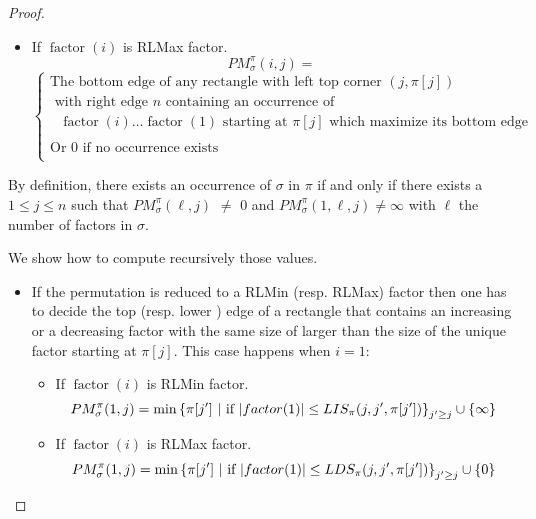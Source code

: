 \documentclass[a4paper]{llncs}
\newcommand{\ptext}{\pi}
\newcommand{\ppattern}{\sigma}
\newcounter{num}
\newcommand{\PM}{PM}
\DeclareMathOperator{\factor}{factor}
\begin{document}
\begin{proof}
\begin{itemize}
\item If $\factor(i)$ is RLMax factor.
$$
\PM^\pi_\sigma(i,j) =
$$
$$
\begin{cases}

	\text{The bottom edge of any rectangle with left top corner   $(j,\pi[j])$} \\
	\text{ with right edge  $n$ containing an occurrence of  } \\
	\text{ $\factor(i) \ldots \factor(1)$ starting at $\pi[j]$ which
	maximize its bottom edge}  \\
	\text{ } \\
	\text{Or $0$ if no occurrence exists} \text{} \\
\end{cases}
$$

\end{itemize}

By definition, there exists an occurrence of $\ppattern$ in $\ptext$ if and only if
there exists a $1 \leq j \leq n$ such that
$\PM^\pi_\sigma(\ell,j)$ $\neq$ $0$ and $\PM^\pi_\sigma(1,\ell,j) \neq \infty$
with $\ell$ the number of factors in $\ppattern$.

We show how to compute recursively those values.
\begin{itemize}
\item If the permutation is reduced to a RLMin (resp. RLMax) factor
then one has to decide the top (resp. lower ) edge of
a rectangle that
contains an increasing or a decreasing factor
with the same size of larger than the
size of the unique factor starting at $\pi[j]$.
This case happens when $i=1$:

\begin{itemize}
\item If $\factor(i)$ is RLMin factor.
$$
\PM^\pi_\sigma(1,j) = \min \text{\{$\pi[j']$ $ |$ if $ |factor(1)| \leq LIS_{\ptext}(j,j',\pi[j'])$\}}_{j'\geq j} \cup \{\infty\}
$$




\item If $\factor(i)$ is RLMax factor.
$$
\PM^\pi_\sigma(1,j) = \min \text{\{$\pi[j']$ $ |$ if $ |factor(1)| \leq LDS_{\ptext}(j,j',\pi[j'])$\}}_{j'\geq j} \cup \{0\}
$$
\end{itemize}




\end{itemize}
\end{proof}
\end{document}
